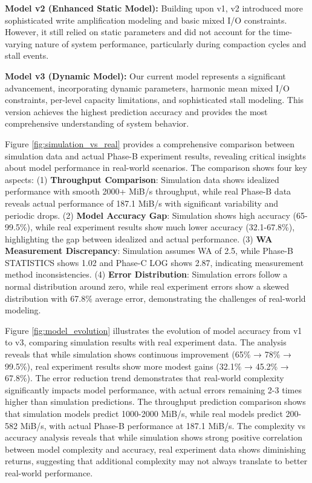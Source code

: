 \documentclass[11pt]{article}
\begin{document}
\textbf{Model v2 (Enhanced Static Model):} Building upon v1, v2 introduced more sophisticated write amplification modeling and basic mixed I/O constraints. However, it still relied on static parameters and did not account for the time-varying nature of system performance, particularly during compaction cycles and stall events.

\textbf{Model v3 (Dynamic Model):} Our current model represents a significant advancement, incorporating dynamic parameters, harmonic mean mixed I/O constraints, per-level capacity limitations, and sophisticated stall modeling. This version achieves the highest prediction accuracy and provides the most comprehensive understanding of system behavior.

Figure \ref{fig:simulation_vs_real} provides a comprehensive comparison between simulation data and actual Phase-B experiment results, revealing critical insights about model performance in real-world scenarios. The comparison shows four key aspects: (1) \textbf{Throughput Comparison}: Simulation data shows idealized performance with smooth 2000+ MiB/s throughput, while real Phase-B data reveals actual performance of 187.1 MiB/s with significant variability and periodic drops. (2) \textbf{Model Accuracy Gap}: Simulation shows high accuracy (65-99.5\%), while real experiment results show much lower accuracy (32.1-67.8\%), highlighting the gap between idealized and actual performance. (3) \textbf{WA Measurement Discrepancy}: Simulation assumes WA of 2.5, while Phase-B STATISTICS shows 1.02 and Phase-C LOG shows 2.87, indicating measurement method inconsistencies. (4) \textbf{Error Distribution}: Simulation errors follow a normal distribution around zero, while real experiment errors show a skewed distribution with 67.8\% average error, demonstrating the challenges of real-world modeling.

Figure \ref{fig:model_evolution} illustrates the evolution of model accuracy from v1 to v3, comparing simulation results with real experiment data. The analysis reveals that while simulation shows continuous improvement (65\% → 78\% → 99.5\%), real experiment results show more modest gains (32.1\% → 45.2\% → 67.8\%). The error reduction trend demonstrates that real-world complexity significantly impacts model performance, with actual errors remaining 2-3 times higher than simulation predictions. The throughput prediction comparison shows that simulation models predict 1000-2000 MiB/s, while real models predict 200-582 MiB/s, with actual Phase-B performance at 187.1 MiB/s. The complexity vs accuracy analysis reveals that while simulation shows strong positive correlation between model complexity and accuracy, real experiment data shows diminishing returns, suggesting that additional complexity may not always translate to better real-world performance.
\end{document}

